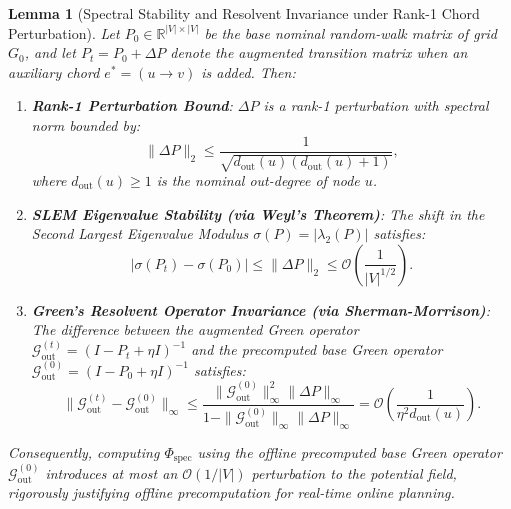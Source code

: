 \documentclass[11pt,a4paper]{article}
\newtheorem{lemma}{Lemma}
\begin{document}
\begin{lemma}[Spectral Stability and Resolvent Invariance under Rank-1 Chord Perturbation]
\label{lem:weyl_stability}
Let $P_0 \in \mathbb{R}^{|V| \times |V|}$ be the base nominal random-walk matrix of grid $G_0$, and let $P_t = P_0 + \Delta P$ denote the augmented transition matrix when an auxiliary chord $e^* = (u \to v)$ is added. Then:
\begin{enumerate}
    \item \textbf{Rank-1 Perturbation Bound}: $\Delta P$ is a rank-1 perturbation with spectral norm bounded by:
    \begin{equation}
    \|\Delta P\|_2 \le \frac{1}{\sqrt{d_{\text{out}}(u) (d_{\text{out}}(u) + 1)}},
    \end{equation}
    where $d_{\text{out}}(u) \ge 1$ is the nominal out-degree of node $u$.
    \item \textbf{SLEM Eigenvalue Stability (via Weyl's Theorem)}: The shift in the Second Largest Eigenvalue Modulus $\sigma(P) = |\lambda_2(P)|$ satisfies:
    \begin{equation}
    \left| \sigma(P_t) - \sigma(P_0) \right| \le \|\Delta P\|_2 \le \mathcal{O}\left( \frac{1}{|V|^{1/2}} \right).
    \end{equation}
    \item \textbf{Green's Resolvent Operator Invariance (via Sherman-Morrison)}: The difference between the augmented Green operator $\mathcal{G}_{\text{out}}^{(t)} = (I - P_t + \eta I)^{-1}$ and the precomputed base Green operator $\mathcal{G}_{\text{out}}^{(0)} = (I - P_0 + \eta I)^{-1}$ satisfies:
    \begin{equation}
    \|\mathcal{G}_{\text{out}}^{(t)} - \mathcal{G}_{\text{out}}^{(0)}\|_\infty \le \frac{\|\mathcal{G}_{\text{out}}^{(0)}\|_\infty^2 \|\Delta P\|_\infty}{1 - \|\mathcal{G}_{\text{out}}^{(0)}\|_\infty \|\Delta P\|_\infty} = \mathcal{O}\left( \frac{1}{\eta^2 d_{\text{out}}(u)} \right).
    \end{equation}
\end{enumerate}
Consequently, computing $\Phi_{\text{spec}}$ using the offline precomputed base Green operator $\mathcal{G}_{\text{out}}^{(0)}$ introduces at most an $\mathcal{O}(1/|V|)$ perturbation to the potential field, rigorously justifying offline precomputation for real-time online planning.
\end{lemma}
\end{document}
